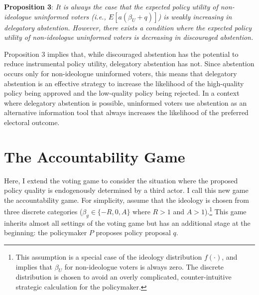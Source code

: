 \documentclass[doc,natbib,12pt]{apa6}
\begin{document}
	\noindent \textbf{Proposition 3}: \textit{It is always the case that the expected policy utility of non-ideologue uninformed voters (i.e., $E[a(\beta_U + q)]$) is weakly increasing in delegatory abstention. However, there exists a condition where the expected policy utility of non-ideologue uninformed voters is decreasing in discouraged abstention.}
	
	\noindent Proposition 3 implies that, while discouraged abstention has the potential to reduce instrumental policy utility, delegatory abstention has not. Since abstention occurs only for non-ideologue uninformed voters, this means that delegatory abstention is an effective strategy to increase the likelihood of the high-quality policy being approved and the low-quality policy being rejected. In a context where delegatory abstention is possible, uninformed voters use abstention as an alternative information tool that always increases the likelihood of the preferred electoral outcome.
	
	\section{The Accountability Game}
	
	\par Here, I extend the voting game to consider the situation where the proposed policy quality is endogenously determined by a third actor. I call this new game the accountability game. For simplicity, assume that the ideology is chosen from three discrete categories ($\beta_g \in \{-R, 0, A\}$ where $R>1$ and $A>1$).\footnote{This assumption is a special case of the ideology distribution $f(\cdot)$, and implies that $\beta_U$ for non-ideologue voters is always zero. The discrete distribution is chosen to avoid an overly complicated, counter-intuitive strategic calculation for the policymaker.} This game inherits almost all settings of the voting game but has an additional stage at the beginning: the policymaker $P$ proposes policy proposal $q$.
	
\end{document}
